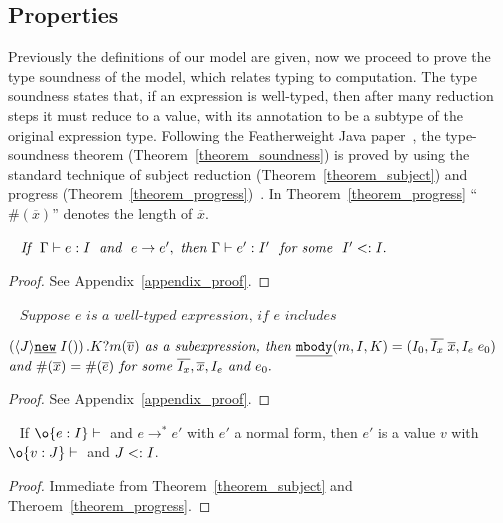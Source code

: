 \begin{comment}
\begin{figure*}[t]
\begin{mathpar}
\end{mathpar}
\caption{Congruence.}\label{fig:congruence}
\end{figure*}
\end{comment}


\subsection{Properties}
Previously the definitions of our model are given, now we proceed to prove the type soundness of 
the model, which relates typing to computation. The type soundness states that, if an expression is 
well-typed, then after many reduction steps it must reduce to a value, with its annotation to be a subtype of the original expression type.
Following the Featherweight Java paper~\cite{Igarashi01FJ}, the type-soundness theorem 
(Theorem~\ref{theorem_soundness}) is proved by using the standard technique of subject reduction (Theorem~\ref{theorem_subject})
and progress (Theorem~\ref{theorem_progress})~\cite{Wright1994}. In Theorem~\ref{theorem_progress} ``$\#(\overline{x})$'' denotes the length of
$\overline{x}$.

\begin{theorem}~\label{theorem_subject}
$\textit{If } \ \judgeewf \Gamma {e : I} \; \textit{ and } \ e \rightarrow e',\ 
\textit{then } \judgeewf \Gamma {e' : I'} \ \textit{ for some } \ I' <: I.$
\end{theorem}
\begin{proof}
See Appendix~\ref{appendix_proof}.
\end{proof}

\begin{theorem}[Progress]~\label{theorem_progress}
$\textit{Suppose } e \textit{ is a well-typed expression, if } e \textit{ includes} $

\noindent $\left(\langle J \rangle\emph{\texttt{new}}\;I()\right).K?m(\overline{v}) \textit{ as a subexpression, then } \emph{\texttt{mbody}}(m, I, K) = (I_0, \overline{I_x} \; \overline{x}, I_e\; e_0) $ $\textit{and } \#(\overline{x}) = \#(\overline{e}) \textit{ for some } \overline{I_x}, \overline{x}, I_e \textit{ and } e_0.$
\end{theorem}
\begin{proof}
See Appendix~\ref{appendix_proof}.
\end{proof}

\begin{theorem}~\label{theorem_soundness}
If $\judgeewf \o {e : I}$ and $e \to^* e'$ with $e'$ a normal form, then $e'$ is 
a value $v$ with $\judgeewf \o {v:J}$ and $J <: I$.
\end{theorem}
\begin{proof}
Immediate from Theorem~\ref{theorem_subject} and Theroem~\ref{theorem_progress}.
\end{proof}
